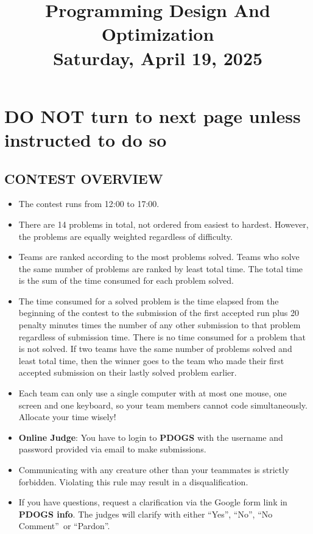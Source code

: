 \documentclass[12pt,a4paper]{article}
\begin{document}
\title{\textbf{Programming Design And Optimization}\\ Saturday, April 19, 2025}
\date{}
\maketitle
\thispagestyle{fancy}
\section*{DO NOT turn to next page unless instructed to do so}
\subsection*{CONTEST OVERVIEW}
\begin{itemize} 
    \item The contest runs from 12:00 to 17:00.
    \item There are 14 problems in total, not ordered from easiest to hardest. However, the problems are equally weighted regardless of difficulty.
    \item Teams are ranked according to the most problems solved. Teams who solve the same number of problems are ranked by least total time. The total time is the sum of the time consumed for each problem solved. 
    \item The time consumed for a solved problem is the time elapsed from the beginning of the contest to the submission of the first accepted run plus 20 penalty minutes times the number of any other submission to that problem regardless of submission time. There is no time consumed for a problem that is not solved. If two teams have the same number of problems solved and least total time, then the winner goes to the team who made their first accepted submission on their lastly solved problem earlier.
    \item Each team can only use a single computer with at most one mouse, one screen and one keyboard, so your team members cannot code simultaneously. Allocate your time wisely! 
    \item \textbf{Online Judge}: You have to login to \textbf{PDOGS} with the username and password provided via email to make submissions.
    \item Communicating with any creature other than your teammates is strictly forbidden. Violating this rule may result in a disqualification.
    \item If you have questions, request a clarification via the Google form link in \textbf{PDOGS info}. The judges will clarify with either \textquotedblleft Yes\textquotedblright, \textquotedblleft No\textquotedblright, \textquotedblleft No Comment\textquotedblright\ or \textquotedblleft Pardon\textquotedblright.
\end{itemize}
\end{document}
